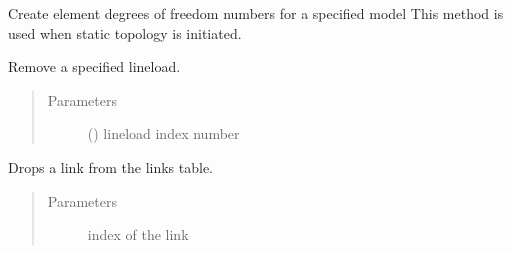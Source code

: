 \documentclass[letterpaper,10pt,english]{sphinxmanual}
\begin{document}
\begin{fulllineitems}
\begin{fulllineitems}
\begin{quote}
\begin{description}
\begin{itemize}
\end{itemize}

\end{description}\end{quote}

\end{fulllineitems}


\begin{fulllineitems}
\label{\detokenize{api:beamon.database.database.Database.make_edof}}
Create element degrees of freedom numbers for a specified model
This method is used when static topology is initiated.

\end{fulllineitems}


\begin{fulllineitems}
\label{\detokenize{api:beamon.database.database.Database.remove_lineload}}
Remove a specified lineload.
\begin{quote}\begin{description}
\item[{Parameters}] \leavevmode
{} () \textendash{} lineload index number

\end{description}\end{quote}

\end{fulllineitems}


\begin{fulllineitems}
\label{\detokenize{api:beamon.database.database.Database.remove_link}}
Drops a link from the links table.
\begin{quote}\begin{description}
\item[{Parameters}] \leavevmode
{} \textendash{} index of the link


\end{description}
\end{quote}
\end{fulllineitems}
\end{fulllineitems}
\end{document}
